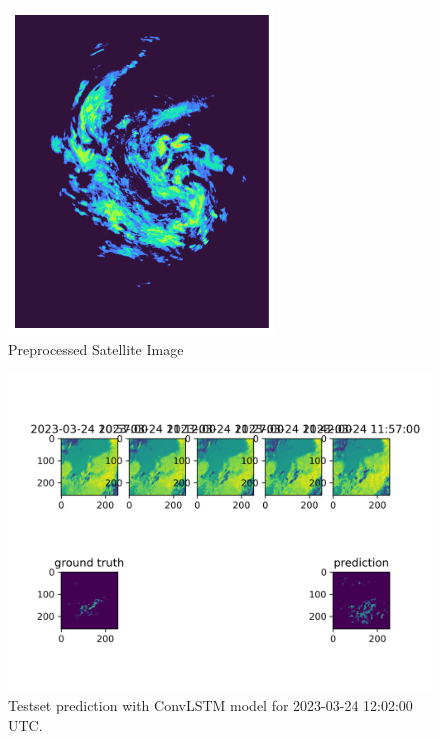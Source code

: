 \documentclass[acmtog, screen, balance]{acmart}
\begin{document}
\begin{figure}[hbp]
  \centering
  \includegraphics[width=200pt]{./images/radar_binned.png}
  \caption{Preprocessed Satellite Image}
  \Description{}
  \label{fig:radar-bin}
\end{figure}

\begin{figure}[hbp]
  \centering
  \includegraphics[width=500pt]{./images/experiment-0.png}
  \caption{Testset prediction with ConvLSTM model for 2023-03-24 12:02:00 UTC.}
  \Description{}
  \label{fig:convclass}
\end{figure}
\end{document}

